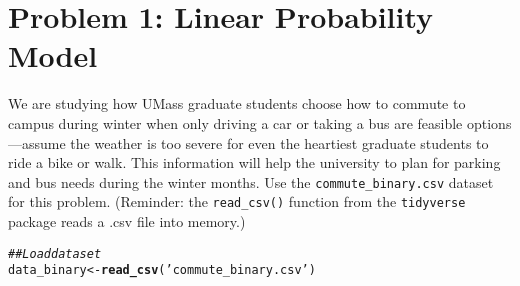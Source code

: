 \documentclass[11pt,letterpaper]{article}\usepackage[]{graphicx}\usepackage[]{color}
\makeatletter
\newcommand{\hlstr}[1]{\textcolor[rgb]{0.192,0.494,0.8}{#1}}%
\newcommand{\hlcom}[1]{\textcolor[rgb]{0.678,0.584,0.686}{\textit{#1}}}%
\newcommand{\hlstd}[1]{\textcolor[rgb]{0.345,0.345,0.345}{#1}}%
\newcommand{\hlkwb}[1]{\textcolor[rgb]{0.69,0.353,0.396}{#1}}%
\newcommand{\hlkwd}[1]{\textcolor[rgb]{0.737,0.353,0.396}{\textbf{#1}}}%
\newenvironment{kframe}{%
 \def\at@end@of@kframe{}%
 \ifinner\ifhmode%
  \def\at@end@of@kframe{\end{minipage}}%
  \begin{minipage}{\columnwidth}%
 \fi\fi%
 \def\FrameCommand##1{\hskip\@totalleftmargin \hskip-\fboxsep
 \colorbox{shadecolor}{##1}\hskip-\fboxsep
     \hskip-\linewidth \hskip-\@totalleftmargin \hskip\columnwidth}%
 \MakeFramed {\advance\hsize-\width
   \@totalleftmargin\z@ \linewidth\hsize
   \@setminipage}}%
 {\par\unskip\endMakeFramed%
 \at@end@of@kframe}
\newenvironment{knitrout}{}{} %
\makeatother
\begin{document}
\section*{Problem 1: Linear Probability Model}

We are studying how UMass graduate students choose how to commute to campus during winter when only driving a car or taking a bus are feasible options---assume the weather is too severe for even the heartiest graduate students to ride a bike or walk. This information will help the university to plan for parking and bus needs during the winter months. Use the \texttt{commute\_binary.csv} dataset for this problem. (Reminder: the \texttt{read\_csv()} function from the \texttt{tidyverse} package reads a .csv file into memory.)

\begin{knitrout}
\color{fgcolor}\begin{kframe}
\begin{alltt}
\hlcom{## Load dataset}
\hlstd{data_binary} \hlkwb{<-} \hlkwd{read_csv}\hlstd{(}\hlstr{'commute_binary.csv'}\hlstd{)}
\end{alltt}


{\ttfamily\noindent\itshape\color{messagecolor}{\#\# Rows: 1000 Columns: 13}}

{\ttfamily\noindent\itshape{}}

{\ttfamily\noindent\itshape\color{messagecolor}{\#\# \\\#\# i Use `spec()` to retrieve the full column specification for this data.\\\#\# i Specify the column types or set `show\_col\_types = FALSE` to quiet this message.}}\end{kframe}
\end{knitrout}
\end{document}
